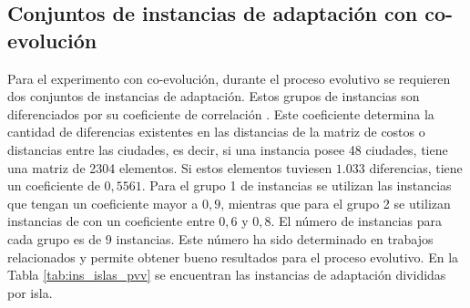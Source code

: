 \subsection{Conjuntos de instancias de adaptación con co-evolución}
\label{cap:ins_trad_pvv}

Para el experimento con co-evolución, durante el proceso evolutivo se requieren dos conjuntos de instancias de adaptación. Estos grupos de instancias son diferenciados por su coeficiente de correlación \citep{smith_2012}. Este coeficiente determina la cantidad de diferencias existentes en las distancias de la matriz de costos o distancias entre las ciudades, es decir, si una instancia posee 48 ciudades, tiene una matriz de 2304 elementos. Si estos elementos tuviesen $1.033$ diferencias, tiene un coeficiente de $0,5561$. Para el grupo 1 de instancias se utilizan las instancias que tengan un coeficiente mayor a $0,9$, mientras que para el grupo 2 se utilizan instancias de con un coeficiente entre $0,6$ y $0,8$. El número de instancias para cada grupo es de 9 instancias. Este número ha sido determinado en trabajos relacionados \citep{parada_2015, contreras_2013} y permite obtener bueno resultados para el proceso evolutivo. En la Tabla \ref{tab:ins_islas_pvv} se encuentran las instancias de adaptación divididas por isla.

